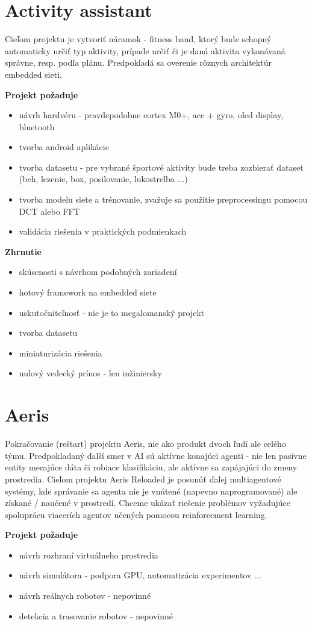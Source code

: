 \documentclass[10pt,a4paper]{article}
\newcommand\pro{\item[{\bf \color{green} +}]}
\newcommand\con{\item[{\bf \color{red} -}]}
\begin{document}
\section{Activity assistant}
Cieľom projektu je vytvoriť náramok - fitness band, ktorý bude schopný automaticky
určiť typ aktivity, prípade určiť či je daná aktivita vykonávaná správne, resp. podľa plánu.
Predpokladá sa overenie rôznych architektúr embedded sieti.

{\bf Projekt požaduje}

\begin{itemize}
    \item návrh hardvéru - pravdepodobne cortex M0+, acc + gyro, oled display, bluetooth
    \item tvorba android aplikácie
    \item tvorba datasetu - pre vybrané športové aktivity bude treba zozbierať dataset
            (beh, lezenie, box, posilovanie, lukostrelba ...)
    \item tvorba modelu siete a trénovanie, zvažuje sa použitie preprocessingu pomocou DCT alebo FFT
    \item validácia riešenia v praktických podmienkach
\end{itemize}

{\bf Zhrnutie}

\begin{itemize}
    \pro skúsenosti s návrhom podobných zariadení
    \pro hotový framework na embedded siete
    \pro uskutočniteľnosť - nie je to megalomanský projekt
    \con tvorba datasetu
    \con miniaturizácia riešenia
    \con nulový vedecký prínos - len inžiniersky
\end{itemize}

\section{Aeris}
Pokračovanie (reštart) projektu Aeris, nie ako produkt dvoch ľudí ale celého týmu.
Predpokladaný ďalší smer v AI sú aktívne konajúci agenti - nie len pasívne entity
merajúce dáta či robiace klasifikáciu, ale aktívne sa zapájajúci do zmeny prostredia.
Cieľom projektu Aeris Reloaded je posunúť ďalej multiagentové systémy, kde správanie
sa agenta nie je vnútené (napevno naprogramované) ale získané / naučené v prostredí.
Chceme ukázať riešenie problémov vyžadujúce spoluprácu viacerích agentov učených pomocou
reinforcement learning.

{\bf Projekt požaduje}

\begin{itemize}
    \item návrh rozhraní virtuálneho prostredia
    \item návrh simulátora - podpora GPU, automatizácia experimentov ...
    \item návrh reálnych robotov - nepovinné
    \item detekcia a trasovanie robotov - nepovinné
\end{itemize}
\end{document}
